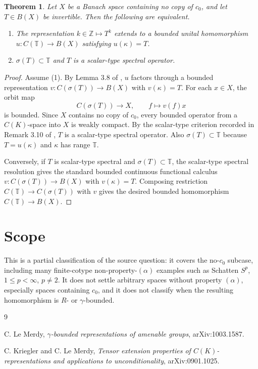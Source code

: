 \documentclass[11pt]{article}
\newcommand{\sig}{\sigma}
\newtheorem*{theorem}{Theorem}
\begin{document}
\begin{theorem}
Let \(X\) be a Banach space containing no copy of \(c_0\), and let
\(T\in B(X)\) be invertible. Then the following are equivalent.
\begin{enumerate}
\item The representation \(k\in\mathbb Z\mapsto T^k\) extends to a bounded
unital homomorphism \(u:C(\mathbb T)\to B(X)\) satisfying \(u(\kappa)=T\).
\item \(\sig(T)\subset\mathbb T\) and \(T\) is a scalar-type spectral operator.
\end{enumerate}
\end{theorem}

\begin{proof}
Assume (1). By Lemma 3.8 of \cite{kriegler-lemerdy}, \(u\) factors through
a bounded representation \(v:C(\sig(T))\to B(X)\) with \(v(\kappa)=T\).
For each \(x\in X\), the orbit map
\[
  C(\sig(T))\longrightarrow X,\qquad f\longmapsto v(f)x
\]
is bounded. Since \(X\) contains no copy of \(c_0\), every bounded operator
from a \(C(K)\)-space into \(X\) is weakly compact. By the scalar-type
criterion recorded in Remark 3.10 of \cite{kriegler-lemerdy}, \(T\) is a
scalar-type spectral operator. Also \(\sig(T)\subset\mathbb T\) because
\(T=u(\kappa)\) and \(\kappa\) has range \(\mathbb T\).

Conversely, if \(T\) is scalar-type spectral and \(\sig(T)\subset\mathbb T\),
the scalar-type spectral resolution gives the standard bounded continuous
functional calculus \(v:C(\sig(T))\to B(X)\) with \(v(\kappa)=T\). Composing
restriction \(C(\mathbb T)\to C(\sig(T))\) with \(v\) gives the desired
bounded homomorphism \(C(\mathbb T)\to B(X)\).
\end{proof}

\section*{Scope}

This is a partial classification of the source question: it covers the
no-\(c_0\) subcase, including many finite-cotype non-property-\((\alpha)\)
examples such as Schatten \(S^p\), \(1\le p<\infty\), \(p\ne2\). It does not
settle arbitrary spaces without property \((\alpha)\), especially spaces
containing \(c_0\), and it does not classify when the resulting homomorphism is
\(R\)- or \(\gamma\)-bounded.

\begin{thebibliography}{9}

C. Le Merdy,
\emph{\(\gamma\)-bounded representations of amenable groups},
arXiv:1003.1587.

C. Kriegler and C. Le Merdy,
\emph{Tensor extension properties of \(C(K)\)-representations and applications to unconditionality},
arXiv:0901.1025.

\end{thebibliography}
\end{document}
